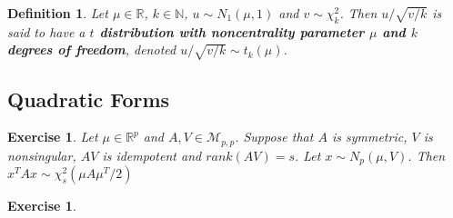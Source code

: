 \documentclass[12pt]{amsart}
\newtheorem{defn}[thm]{Definition}
\newtheorem{ex}[thm]{Exercise}
\newcommand{\N}{\mathbb{N}}
\newcommand{\R}{\mathbb{R}}
\newcommand{\MM}{\mathcal{M}}
\begin{document}
\begin{defn}
Let $\mu \in \R$, $k \in \N$, $u \sim N_1(\mu, 1)$ and $v \sim \chi^2_k$. Then $u/\sqrt{v/k}$ is said to have a \textbf{$t$ distribution with noncentrality parameter $\mu$ and $k$ degrees of freedom}, denoted $u/\sqrt{v/k} \sim t_k(\mu)$. 
\end{defn}

\subsection{Quadratic Forms}

\begin{ex}
Let $\mu \in \R^p$ and $A, V \in \MM_{p,p}$. Suppose that $A$ is symmetric, $V$ is nonsingular, $AV$ is idempotent and $rank(AV) = s$. Let $x \sim N_p(\mu, V)$. Then $x^TAx \sim \chi^2_s(\mu A \mu^T/2)$
\end{ex}

\begin{ex}

\end{ex}
\end{document}
